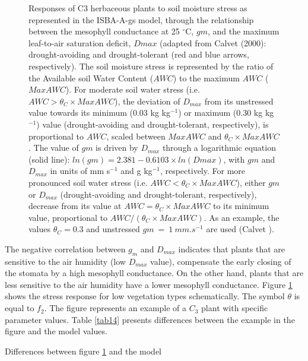 {\begin{figure}[h]
\hspace*{2.cm}
\begin{center}
\caption{Responses of C3 herbaceous plants to soil moisture stress
as represented in the ISBA-A-gs model, through the relationship
between the mesophyll conductance at 25 $^{\circ}$C, $gm$, and the maximum
leaf-to-air saturation deficit, $Dmax$ (adapted from Calvet (2000): 
drought-avoiding and drought-tolerant (red and blue arrows,
respectively). The soil moisture stress is represented by the ratio of the
Available soil Water Content ($AWC$) to the maximum $AWC$ ($MaxAWC$).
For moderate soil water stress (i.e. $AWC > \theta_C \times MaxAWC$), 
the deviation of $D_{max}$ from its unstressed value
towards its minimum (0.03 kg kg$^{-1}$) or maximum (0.30 kg kg$^{-1}$)
value (drought-avoiding and drought-tolerant, respectively), is proportional
to $AWC$, scaled between $MaxAWC$ and $\theta_C \times MaxAWC$.
The value of $gm$ is driven by $D_{max}$ through a logarithmic equation
(solid line): $ln(gm)=2.381 − 0.6103 \times ln(Dmax)$, with $gm$ and
$D_{max}$ in units of mm s$^{−1}$ and g kg$^{−1}$, respectively. For more pronounced
soil water stress (i.e. $AWC < \theta_C \times MaxAWC$), either $gm$
or $D_{max}$ (drought-avoiding and drought-tolerant, respectively), decrease
from its value at $AWC = \theta_C \times MaxAWC$ to its minimum
value, proportional to $AWC/(\theta_C \times MaxAWC)$. As an example, the values
$\theta_C = 0.3$ and unstressed $gm~=~1~mm.s^{-1}$ are used (Calvet ).}
\label{stress}
\end{center}
\end{figure}
\nocite{Calvet2012}

The negative correlation between $g_{m}$ and $D_{max}$ indicates that plants that are sensitive to the air
humidity (low $D_{max}$ value), compensate the early closing of the stomata by a high mesophyll
conductance. On the other hand, plants that are less sensitive to the air humidity have a lower
mesophyll conductance. Figure \ref{stress} shows the stress response for low vegetation types schematically.
The symbol $\theta$ is equal to $f_{2}$. The figure represents an example of a $C_{3}$ plant with specific parameter
values. Table \ref{tab14} presents differences between the example in the figure and the model values.

\begin{table}
\caption{Differences between figure \ref{stress} and the model}


\end{table}}
